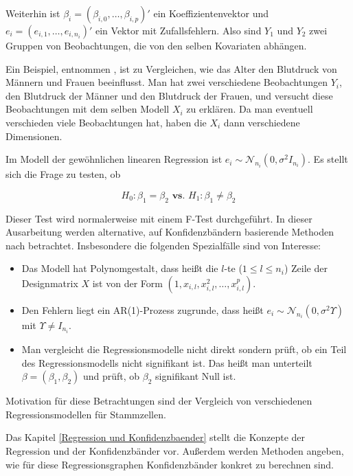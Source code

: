 \documentclass[12pt,a4paper]{article}
\theoremstyle{definition}
\theoremstyle{definition}
\theoremstyle{definition}
\begin{document}
Weiterhin ist $\beta_i = (\beta_{i,0}, \ldots, \beta_{i,p})'$ ein Koeffizientenvektor und  $e_i = (e_{i,1}, \ldots, e_{i,n_i})'$ ein Vektor mit Zufallsfehlern. Also sind $Y_1$ und $Y_2$ zwei Gruppen von Beobachtungen, die von den selben Kovariaten abhängen. 

Ein Beispiel, entnommen \cite[116]{Liu64}, ist zu Vergleichen, wie das Alter den Blutdruck von Männern und Frauen beeinflusst. Man hat zwei verschiedene Beobachtungen $Y_i$, den Blutdruck der Männer und den Blutdruck der Frauen, und versucht diese Beobachtungen mit dem selben Modell $X_i$ zu erklären. Da man eventuell verschieden viele Beobachtungen hat, haben die $X_i$ dann verschiedene Dimensionen.

Im Modell der gewöhnlichen linearen Regression ist $e_i \sim \mathscr{N}_{n_i}(0,\sigma^2 I_{n_i})$. Es stellt sich die Frage zu testen, ob

\begin{equation*}
H_{0} : \beta_{1} = \beta_{2}  \textbf{ vs. }  H_{1} : \beta_{1} \neq \beta_{2}
\end{equation*}

Dieser Test wird normalerweise mit einem F-Test durchgeführt. In dieser Ausarbeitung werden alternative, auf Konfidenzbändern basierende Methoden nach \cite{Liu64} betrachtet. Insbesondere die folgenden Spezialfälle sind von Interesse:

\begin{itemize}
\item Das Modell hat Polynomgestalt, dass heißt die $l$-te ($1 \leq l \leq n_i $) Zeile der Designmatrix $X$ ist von der Form $(1, x_{i,l}, x_{i,l}^2, \ldots, x_{i,l}^p)$.
\item Den Fehlern liegt ein AR(1)-Prozess zugrunde, dass heißt $e_i \sim \mathscr{N}_{n_i}(0,\sigma^2 \Upsilon)$ mit $\Upsilon \neq I_{n_i}$.
\item Man vergleicht die Regressionsmodelle nicht direkt sondern prüft, ob ein Teil des Regressionsmodells nicht signifikant ist. Das heißt man unterteilt $\beta = (\beta_1, \beta_2)$ und prüft, ob $\beta_2$ signifikant Null ist. 
\end{itemize} 

Motivation für diese Betrachtungen sind der Vergleich von verschiedenen Regressionsmodellen für Stammzellen.

Das Kapitel \ref{Regression und Konfidenzbaender} stellt die Konzepte der Regression und der Konfidenzbänder vor. Außerdem werden Methoden angeben, wie für diese Regressionsgraphen Konfidenzbänder konkret zu berechnen sind. 
\end{document}
